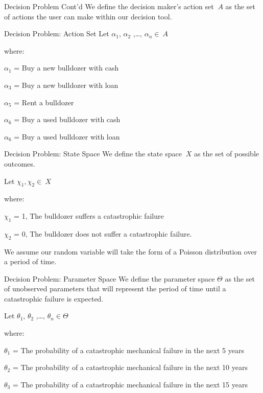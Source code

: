 \documentclass[
  ignorenonframetext,
]{beamer}
\begin{document}
\begin{frame}{Decision Problem Cont'd}
\protect\hypertarget{decision-problem-contd}{}
We define the decision maker's action set \(\ A\) as the set of actions
the user can make within our decision tool.
\end{frame}

\begin{frame}{Decision Problem: Action Set}
\protect\hypertarget{decision-problem-action-set}{}
Let \(\alpha_{1}\), \(\alpha_{2}\) ,\ldots, \(\alpha_{n} \in \ A\)

where:

\(\alpha_{1}\) = Buy a new bulldozer with cash

\(\alpha_{3}\) = Buy a new bulldozer with loan

\(\alpha_{5}\) = Rent a bulldozer

\(\alpha_{6}\) = Buy a used bulldozer with cash

\(\alpha_{6}\) = Buy a used bulldozer with loan
\end{frame}

\begin{frame}{Decision Problem: State Space}
\protect\hypertarget{decision-problem-state-space}{}
We define the state space \(\ X\) as the set of possible outcomes.

Let \(\chi_{1}, \chi_{2} \in \ X\)

where:

\(\chi_{1}\) = 1, The bulldozer suffers a catastrophic failure

\(\chi_{2}\) = 0, The bulldozer does not suffer a catastrophic failure.

We assume our random variable will take the form of a Poisson
distribution over a period of time.
\end{frame}

\begin{frame}{Decision Problem: Parameter Space}
\protect\hypertarget{decision-problem-parameter-space}{}
We define the parameter space \(\Theta\) as the set of unobserved
parameters that will represent the period of time until a catastrophic
failure is expected.

Let \(\theta_{1}\), \(\theta_{2}\) ,\ldots, \(\theta_{n} \in \Theta\)

where:

\(\theta_{1}\) = The probability of a catastrophic mechanical failure in
the next 5 years

\(\theta_{2}\) = The probability of a catastrophic mechanical failure in
the next 10 years

\(\theta_{3}\) = The probability of a catastrophic mechanical failure in
the next 15 years
\end{frame}
\end{document}
